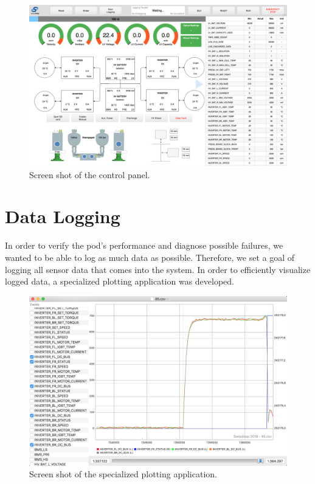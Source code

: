 \begin{figure}[H]
  \centering \includegraphics[width=1.0\textwidth]{./figures/Screen_Shot_Control_Panel.png}
  \caption{Screen shot of the control panel.}
\end{figure}

\section{Data Logging}

In order to verify the pod's performance and diagnose possible failures, we wanted to be able to log as much data as possible. Therefore, we set a goal of logging all sensor data that comes into the system. In order to efficiently visualize logged data, a specialized plotting application was developed.

\begin{figure}[H]
  \centering \includegraphics[width=1.0\textwidth]{./figures/Screen_Shot_Plot.png}
  \caption{Screen shot of the specialized plotting application.}
\end{figure}

